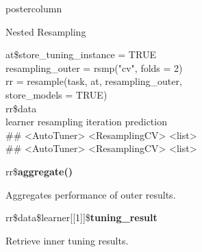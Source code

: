 \documentclass{beamer}
\begin{document}
\begin{frame}[fragile]{}
\begin{columns}
\begin{column}{.245\textwidth}
\begin{beamercolorbox}[center]{postercolumn}
\begin{minipage}{.98\textwidth}
{\begin{myblock}{Nested Resampling}
\begin{codeboxexample}
{									at\$store\_tuning\_instance = TRUE
									\vspace{1em}
									\\
									resampling\_outer = rsmp("cv", folds = 2)\\
									rr = resample(task, at, resampling\_outer, \\
									\hspace*{1ex}store\_models = TRUE)
									\vspace{1em}
									\\
									rr\$data
									\vspace{1em}
									\\
									\phantom{n} \space\space\space\space\space learner \space\space\space\space resampling iteration prediction\\
									 \#\# <AutoTuner> <ResamplingCV> \space\space\space\space\space\space\space{} \space\space\space\space <list>\\
									 \#\# <AutoTuner> <ResamplingCV> \space\space\space\space\space\space\space{} \space\space\space\space <list>}
							\end{codeboxexample}
							\vspace{1em}
							\begin{codebox}
								rr\$\textbf{aggregate()}
							\end{codebox}
							Aggregates performance of outer results.
							\\
							\begin{codebox}
								rr\$data\$learner[[1]]\$\textbf{tuning\_result}
							\end{codebox}
							Retrieve inner tuning results.
						\end{myblock}
						\vfill}
				\end{minipage}
			\end{beamercolorbox}
		\end{column}
	\end{columns}
\end{frame}
\end{document}

